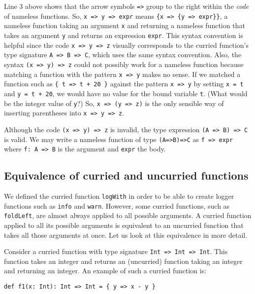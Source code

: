 Line 3 above shows that the arrow symbols \lstinline!=>! group to
the right within the \emph{code} of nameless functions. So, \lstinline!x => y => expr!
means \lstinline!{x => {y => expr}}!, a nameless function taking
an argument \lstinline!x! and returning a nameless function that
takes an argument \lstinline!y! and returns an expression \lstinline!expr!.
This syntax convention is helpful since the code \lstinline!x => y => z!
visually corresponds to the curried function\textsf{'}s type signature \lstinline!A => B => C!,
which uses the same syntax convention. Also, the syntax \lstinline!(x => y) => z!
could not possibly work for a nameless function because  matching
a function with the pattern \lstinline!x => y! makes no sense. If
we matched a function such as \lstinline!{ t => t + 20 }! against
the pattern \lstinline!x => y! by setting \lstinline!x = t! and
\lstinline!y = t + 20!, we would have no value for the bound variable
\lstinline!t!. (What would be the integer value of \lstinline!y!?)
So, \lstinline!x => (y => z)! is the only sensible way of inserting
parentheses into \lstinline!x => y => z!.

Although the code \lstinline!(x => y) => z! is invalid, the type
expression \lstinline!(A => B) => C! is valid. We may write a nameless
function of type \lstinline!(A=>B)=>C! as \lstinline!f => expr!
where \lstinline!f: A => B! is the argument and \lstinline!expr!
the body.

\subsection{Equivalence of curried and uncurried functions}

We defined the curried function \lstinline!logWith! in order to be
able to create logger functions such as \lstinline!info! and \lstinline!warn!.
However, some curried functions, such as \lstinline!foldLeft!, are
almost always applied to all possible arguments. A curried function
applied to all its possible arguments is equivalent to an uncurried
function that takes all those arguments at once. Let us look at this
equivalence in more detail.

Consider a curried function with type signature \lstinline!Int => Int => Int!.
This function takes an integer and returns an (uncurried) function
taking an integer and returning an integer. An example of such a curried
function is:
\begin{lstlisting}
def f1(x: Int): Int => Int = { y => x - y }
\end{lstlisting}

